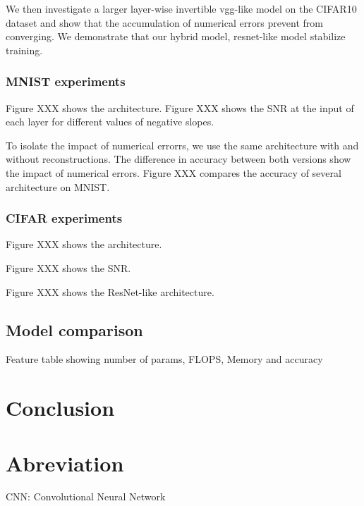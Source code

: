 \documentclass[twocolumn]{bmcart}
\begin{document}
We then investigate a larger layer-wise invertible vgg-like model on the CIFAR10 dataset and show that the accumulation of numerical errors prevent from converging.
We demonstrate that our hybrid model, resnet-like model stabilize training.

\subsubsection{MNIST experiments}

Figure XXX shows the architecture.
Figure XXX shows the SNR at the input of each layer for different values of negative slopes.

To isolate the impact of numerical errorrs, we use the same architecture with and without reconstructions.
The difference in accuracy between both versions show the impact of numerical errors.
Figure XXX compares the accuracy of several architecture on MNIST.

\subsubsection{CIFAR experiments}

Figure XXX shows the architecture.

Figure XXX shows the SNR.

Figure XXX shows the ResNet-like architecture.

\subsection{Model comparison}

Feature table showing number of params, FLOPS, Memory and accuracy



\section{Conclusion}



\section*{Abreviation}

CNN: Convolutional Neural Network  \\
\end{document}
